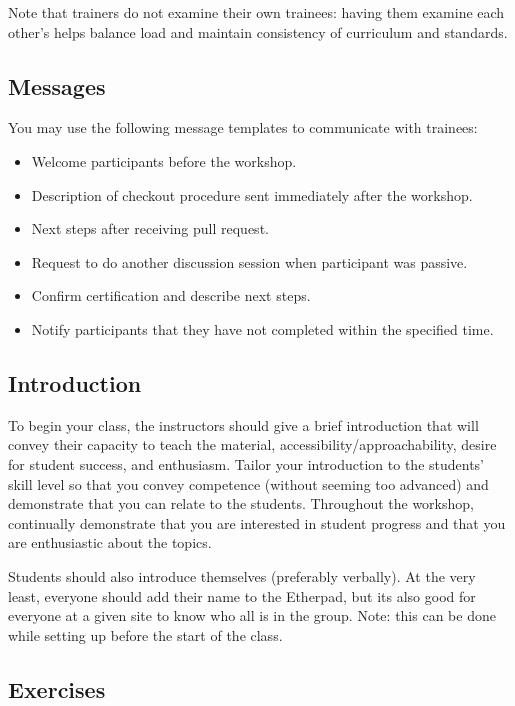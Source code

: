 Note that trainers do not examine their own trainees: having them
examine each other's helps balance load and maintain consistency of
curriculum and standards.

\subsection{Messages}\label{messages}

You may use the following message templates to communicate with
trainees:

\begin{itemize}
\item
  Welcome participants before the workshop.
\item
  Description of checkout procedure sent immediately after the workshop.
\item
  Next steps after receiving pull request.
\item
  Request to do another discussion session when participant was passive.
\item
  Confirm certification and describe next steps.
\item
  Notify participants that they have not completed within the specified time.
\end{itemize}

\subsection{Introduction}\label{introduction}

To begin your class, the instructors should give a brief introduction
that will convey their capacity to teach the material,
accessibility/approachability, desire for student success, and
enthusiasm. Tailor your introduction to the students' skill level so
that you convey competence (without seeming too advanced) and
demonstrate that you can relate to the students. Throughout the
workshop, continually demonstrate that you are interested in student
progress and that you are enthusiastic about the topics.

Students should also introduce themselves (preferably verbally). At the
very least, everyone should add their name to the Etherpad, but its also
good for everyone at a given site to know who all is in the group. Note:
this can be done while setting up before the start of the class.

\subsection{Exercises}\label{exercises}

